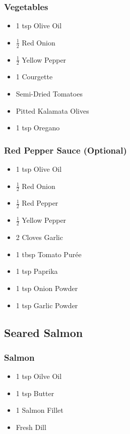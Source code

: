 \documentclass[11pt, english]{article}
\begin{document}
		\subsubsection*{Vegetables}

	\begin{itemize}
        \setlength\itemsep{0cm}
                \item 1 tsp Olive Oil
		\item $\frac{1}{2}$ Red Onion
		\item $\frac{1}{2}$ Yellow Pepper
		\item 1 Courgette
		\item Semi-Dried Tomatoes
		\item Pitted Kalamata Olives
		\item 1 tsp Oregano
        \end{itemize}

		\subsubsection*{Red Pepper Sauce (Optional)}
		
	\begin{itemize}
        \setlength\itemsep{0cm}
                \item 1 tsp Olive Oil
		\item $\frac{1}{2}$ Red Onion
		\item $\frac{1}{2}$ Red Pepper
		\item $\frac{1}{2}$ Yellow Pepper
		\item 2 Cloves Garlic
		\item 1 tbsp Tomato Pur\'{e}e
		\item 1 tsp Paprika
		\item 1 tsp Onion Powder 
		\item 1 tsp Garlic Powder
        \end{itemize}

\newpage

	\subsection{Seared Salmon}

		\subsubsection*{Salmon}

	\begin{itemize}
        \setlength\itemsep{0cm}
                \item 1 tsp Oilve Oil
		\item 1 tsp Butter
		\item 1 Salmon Fillet
		\item Fresh Dill
        \end{itemize}
\end{document}
